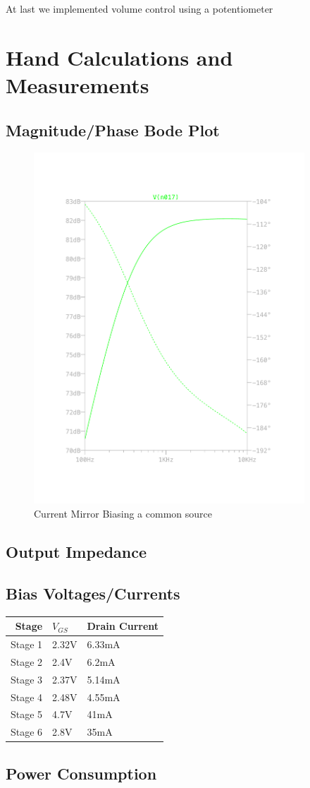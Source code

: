 \documentclass[11pt, twoside, letterpaper]{article}
\begin{document}
At last we implemented volume control using a potentiometer 

\section{Hand Calculations and Measurements}
\subsection*{Magnitude/Phase Bode Plot}
\begin{figure}[htbp]
\begin{center}
\includegraphics[width=4in]{MagPlot.pdf}
\caption{Current Mirror Biasing a common source}
\end{center}
\end{figure}
\FloatBarrier

\subsection*{Output Impedance}
\subsection*{Bias Voltages/Currents}
\begin{tabular}{|r|l|l|}
\hline
Stage & $V_{GS}$ & Drain Current\\
\hline
Stage 1 &2.32V&6.33mA\\
Stage 2 &2.4V&6.2mA\\
Stage 3 &2.37V&5.14mA\\
Stage 4 &2.48V&4.55mA\\
Stage 5 &4.7V&41mA\\
Stage 6 &2.8V&35mA\\
\hline
\end{tabular}
\subsection*{Power Consumption}
\end{document}
